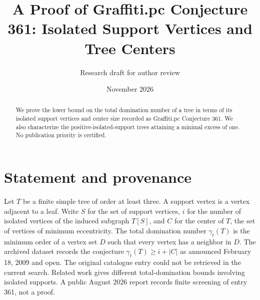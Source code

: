 \documentclass[11pt]{article}
\title{A Proof of Graffiti.pc Conjecture 361: Isolated Support Vertices and Tree Centers}
\author{Research draft for author review}
\date{November 2026}
\begin{document}
\maketitle
\begin{abstract}
We prove the lower bound on the total domination number of a tree in terms of its isolated support vertices and center size recorded as Graffiti.pc Conjecture 361. We also characterize the positive-isolated-support trees attaining a minimal excess of one. No publication priority is certified.
\end{abstract}
\section{Statement and provenance}
Let $T$ be a finite simple tree of order at least three. A support vertex is a vertex adjacent to a leaf. Write $S$ for the set of support vertices, $i$ for the number of isolated vertices of the induced subgraph $T[S]$, and $C$ for the center of $T$, the set of vertices of minimum eccentricity. The total domination number $\gamma_t(T)$ is the minimum order of a vertex set $D$ such that every vertex has a neighbor in $D$. The archived dataset \cite{archive} records the conjecture $\gamma_t(T)\ge i+|C|$ as announced February 18, 2009 and open. The original catalogue entry \cite{wow} could not be retrieved in the current search. Related work \cite{related} gives different total-domination bounds involving isolated supports. A public August 2026 report \cite{screen} records finite screening of entry 361, not a proof.
\end{document}
